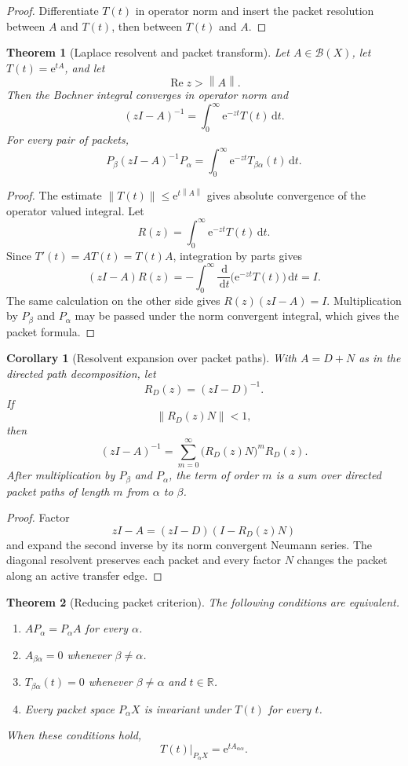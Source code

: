 \documentclass[11pt,letterpaper]{article}
\newtheorem{theorem}{Theorem}[section]
\theoremstyle{plain}
\theoremstyle{plain}
\theoremstyle{plain}
\newtheorem{corollary}[corollary]{Corollary}
\theoremstyle{definition}
\theoremstyle{definition}
\theoremstyle{definition}
\theoremstyle{definition}
\theoremstyle{definition}
\theoremstyle{remark}
\theoremstyle{remark}
\theoremstyle{remark}
\theoremstyle{remark}
\theoremstyle{remark}
\newcommand{\norm}[1]{\left\lVert#1\right\rVert}
\theoremstyle{remark}
\newcommand{\RR}{\mathbb R}
\newcommand{\e}{\mathrm e}
\newcommand{\dd}{\,\mathrm d}
\let\KomorebiPrimitiveMathcal\mathcal
\renewcommand{\mathcal}[1]{{\KomorebiPrimitiveMathcal{#1}}}
\let\KomorebiPrimitivemathbb\mathbb
\renewcommand{\mathbb}[1]{{\KomorebiPrimitivemathbb{#1}}}
\let\KomorebiPrimitivemathrm\mathrm
\renewcommand{\mathrm}[1]{{\KomorebiPrimitivemathrm{#1}}}
\begin{document}
\begin{proof}
Differentiate \(T(t)\) in operator norm and insert the packet resolution between \(A\) and \(T(t)\), then between \(T(t)\) and \(A\).
\end{proof}

\begin{theorem}[Laplace resolvent and packet transform]\label{extended:record:005}\label{extended:thm:laplace_packet_resolvent}
Let \(A\in\mathcal B(X)\), let \(T(t)=\e^{tA}\), and let
\[
\operatorname{Re}z>\norm A.
\]
Then the Bochner integral converges in operator norm and
\[
(zI-A)^{-1}
=
\int_0^\infty \e^{-zt}T(t)\dd t.
\]
For every pair of packets,
\[
P_\beta(zI-A)^{-1}P_\alpha
=
\int_0^\infty
\e^{-zt}T_{\beta\alpha}(t)\dd t.
\]
\end{theorem}

\begin{proof}
The estimate \(\norm{T(t)}\leq\e^{t\norm A}\) gives absolute convergence of the operator valued integral. Let
\[
R(z)=\int_0^\infty\e^{-zt}T(t)\dd t.
\]
Since \(T'(t)=AT(t)=T(t)A\), integration by parts gives
\[
(zI-A)R(z)
=
-\int_0^\infty
\frac{\dd}{\dd t}
\bigl(\e^{-zt}T(t)\bigr)
\dd t
=I.
\]
The same calculation on the other side gives
\(
R(z)(zI-A)=I
\).
Multiplication by \(P_\beta\) and \(P_\alpha\) may be passed under the norm convergent integral, which gives the packet formula.
\end{proof}

\begin{corollary}[Resolvent expansion over packet paths]\label{extended:record:006}\label{extended:cor:resolvent_packet_paths}
With \(A=D+N\) as in the directed path decomposition, let
\[
R_D(z)=(zI-D)^{-1}.
\]
If
\[
\norm{R_D(z)N}<1,
\]
then
\[
(zI-A)^{-1}
=
\sum_{m=0}^\infty
\bigl(R_D(z)N\bigr)^mR_D(z).
\]
After multiplication by \(P_\beta\) and \(P_\alpha\), the term of order \(m\) is a sum over directed packet paths of length \(m\) from \(\alpha\) to \(\beta\).
\end{corollary}

\begin{proof}
Factor
\[
zI-A=(zI-D)(I-R_D(z)N)
\]
and expand the second inverse by its norm convergent Neumann series. The diagonal resolvent preserves each packet and every factor \(N\) changes the packet along an active transfer edge.
\end{proof}

\begin{theorem}[Reducing packet criterion]\label{extended:record:007}\label{extended:thm:reducing_packets}
The following conditions are equivalent.
\begin{enumerate}
\item \(AP_\alpha=P_\alpha A\) for every \(\alpha\).
\item \(A_{\beta\alpha}=0\) whenever \(\beta\neq\alpha\).
\item \(T_{\beta\alpha}(t)=0\) whenever \(\beta\neq\alpha\) and \(t\in\RR\).
\item Every packet space \(P_\alpha X\) is invariant under \(T(t)\) for every \(t\).
\end{enumerate}
When these conditions hold,
\[
T(t)|_{P_\alpha X}
=
\e^{tA_{\alpha\alpha}}.
\]
\end{theorem}
\end{document}
